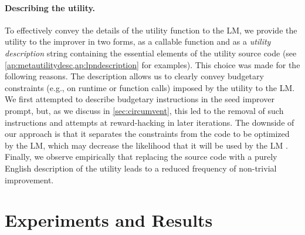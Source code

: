 \documentclass{article} %
\begin{document}
\paragraph{Describing the utility.} 
To effectively convey the details of the utility function to the LM,  %
%
we provide the utility to the improver in two forms, as a callable function and as a \emph{utility description} string containing the essential elements of the utility source code (see \cref{ap:metautilitydesc,ap:lpndescription} for examples). 
This choice was made for the following reasons. 
The description allows us to clearly convey budgetary constraints (e.g., on runtime or function calls) imposed by the utility to the LM. We first attempted to describe budgetary instructions in the seed improver prompt, but, as we discuss in \cref{sec:circumvent}, this led to the removal of such instructions and attempts at reward-hacking in later iterations. 
The downside of our approach is that it separates the constraints from the code to be optimized by the LM, which may decrease the likelihood that it will be used by the LM \citep{liu2023lost}.
Finally, we observe empirically that replacing the source code with a purely English description of the utility leads to a reduced frequency of non-trivial improvement.%
%
%
%
%
%
%
%

%

%
\section{Experiments and Results}
%
%
\label{sec:experiments}
%
\end{document}
